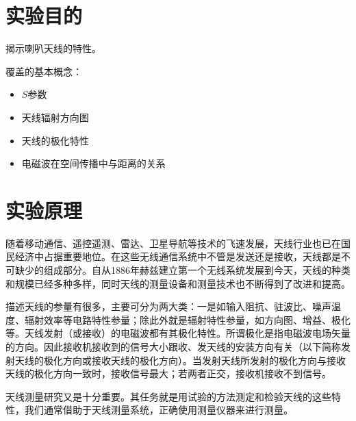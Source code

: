 \documentclass[12pt,hyperref,a4paper,UTF8]{ctexart}
\begin{document}
\cover

%
%

\thispagestyle{empty} %

\newpage
\tableofcontents

\newpage



\section{实验目的}

揭示喇叭天线的特性。

覆盖的基本概念：
\begin{itemize}
    \item $S$参数
    \item 天线辐射方向图
    \item 天线的极化特性
    \item 电磁波在空间传播中与距离的关系
\end{itemize}


\section{实验原理}

随着移动通信、遥控遥测、雷达、卫星导航等技术的飞速发展，天线行业也已在国民经济中占据重要地位。在这些无线通信系统中不管是发送还是接收，天线都是不可缺少的组成部分。自从1886年赫兹建立第一个无线系统发展到今天，天线的种类和规模已经多种多样，同时天线的测量设备和测量技术也不断得到了改进和提高。

描述天线的参量有很多，主要可分为两大类：一是如输入阻抗、驻波比、噪声温度、辐射效率等电路特性参量；除此外就是辐射特性参量，如方向图、增益、极化等。天线发射（或接收）的电磁波都有其极化特性。所谓极化是指电磁波电场矢量的方向。因此接收机接收到的信号大小跟收、发天线的安装方向有关（以下简称发射天线的极化方向或接收天线的极化方向）。当发射天线所发射的极化方向与接收天线的极化方向一致时，接收信号最大；若两者正交，接收机接收不到信号。

天线测量研究又是十分重要。其任务就是用试验的方法测定和检验天线的这些特性，我们通常借助于天线测量系统，正确使用测量仪器来进行测量。
\end{document}
